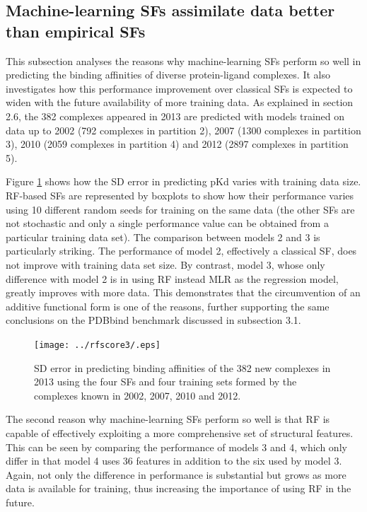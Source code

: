 \subsection{Machine-learning SFs assimilate data better than empirical SFs}

This subsection analyses the reasons why machine-learning SFs perform so well in predicting the binding affinities of diverse protein-ligand complexes. It also investigates how this performance improvement over classical SFs is expected to widen with the future availability of more training data. As explained in section 2.6, the 382 complexes appeared in 2013 are predicted with models trained on data up to 2002 (792 complexes in partition 2), 2007 (1300 complexes in partition 3), 2010 (2059 complexes in partition 4) and 2012 (2897 complexes in partition 5). 

Figure \ref{rfscore3:partitions2345SD} shows how the SD error in predicting pKd varies with training data size. RF-based SFs are represented by boxplots to show how their performance varies using 10 different random seeds for training on the same data (the other SFs are not stochastic and only a single performance value can be obtained from a particular training data set). The comparison between models 2 and 3 is particularly striking. The performance of model 2, effectively a classical SF, does not improve with training data set size. By contrast, model 3, whose only difference with model 2 is in using RF instead MLR as the regression model, greatly improves with more data. This demonstrates that the circumvention of an additive functional form is one of the reasons, further supporting the same conclusions on the PDBbind benchmark discussed in subsection 3.1.

\begin{figure}
\centering
\texttt{[image: ../rfscore3/.eps]}
\caption{SD error in predicting binding affinities of the 382 new complexes in 2013 using the four SFs and four training sets formed by the complexes known in 2002, 2007, 2010 and 2012.}
\label{rfscore3:partitions2345SD}
\end{figure}

The second reason why machine-learning SFs perform so well is that RF is capable of effectively exploiting a more comprehensive set of structural features. This can be seen by comparing the performance of models 3 and 4, which only differ in that model 4 uses 36 features in addition to the six used by model 3. Again, not only the difference in performance is substantial but grows as more data is available for training, thus increasing the importance of using RF in the future.

